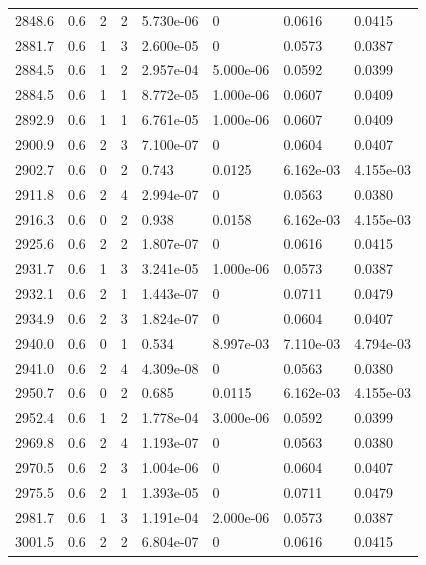 \documentclass[preview]{standalone}
\begin{document}
{{{{{{{{\begin{tabular}{L{1.2cm}C{1.2cm} C{0.3cm}C{0.5cm} C{1.4cm}C{1.4cm} C{1.4cm}C{1.4cm}}
  2848.6  &   0.6  & 2     &  2 &  5.730e-06  & 0  & 0.0616 &  0.0415   \\ 
  2881.7  &   0.6  & 1     &  3 &  2.600e-05  & 0  & 0.0573 &  0.0387   \\ 
  2884.5  &   0.6  & 1     &  2 &  2.957e-04  & 5.000e-06  & 0.0592 &  0.0399   \\ 
  2884.5  &   0.6  & 1     &  1 &  8.772e-05  & 1.000e-06  & 0.0607 &  0.0409   \\ 
  2892.9  &   0.6  & 1     &  1 &  6.761e-05  & 1.000e-06  & 0.0607 &  0.0409   \\ 
  2900.9  &   0.6  & 2     &  3 &  7.100e-07  & 0  & 0.0604 &  0.0407   \\ 
  2902.7  &   0.6  & 0     &  2 &  0.743  & 0.0125  & 6.162e-03 &  4.155e-03   \\ 
  2911.8  &   0.6  & 2     &  4 &  2.994e-07  & 0  & 0.0563 &  0.0380   \\ 
  2916.3  &   0.6  & 0     &  2 &  0.938  & 0.0158  & 6.162e-03 &  4.155e-03   \\ 
  2925.6  &   0.6  & 2     &  2 &  1.807e-07  & 0  & 0.0616 &  0.0415   \\ 
  2931.7  &   0.6  & 1     &  3 &  3.241e-05  & 1.000e-06  & 0.0573 &  0.0387   \\ 
  2932.1  &   0.6  & 2     &  1 &  1.443e-07  & 0  & 0.0711 &  0.0479   \\ 
  2934.9  &   0.6  & 2     &  3 &  1.824e-07  & 0  & 0.0604 &  0.0407   \\ 
  2940.0  &   0.6  & 0     &  1 &  0.534  & 8.997e-03  & 7.110e-03 &  4.794e-03   \\ 
  2941.0  &   0.6  & 2     &  4 &  4.309e-08  & 0  & 0.0563 &  0.0380   \\ 
  2950.7  &   0.6  & 0     &  2 &  0.685  & 0.0115  & 6.162e-03 &  4.155e-03   \\ 
  2952.4  &   0.6  & 1     &  2 &  1.778e-04  & 3.000e-06  & 0.0592 &  0.0399   \\ 
  2969.8  &   0.6  & 2     &  4 &  1.193e-07  & 0  & 0.0563 &  0.0380   \\ 
  2970.5  &   0.6  & 2     &  3 &  1.004e-06  & 0  & 0.0604 &  0.0407   \\ 
  2975.5  &   0.6  & 2     &  1 &  1.393e-05  & 0  & 0.0711 &  0.0479   \\ 
  2981.7  &   0.6  & 1     &  3 &  1.191e-04  & 2.000e-06  & 0.0573 &  0.0387   \\ 
  3001.5  &   0.6  & 2     &  2 &  6.804e-07  & 0  & 0.0616 &  0.0415   \\ 

\end{tabular}}}}}}}}}
\end{document}
